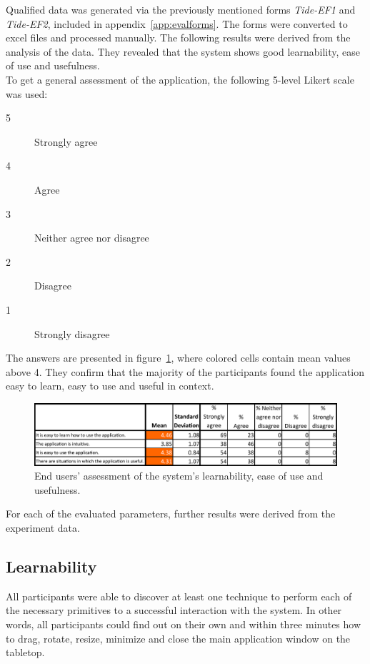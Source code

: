 Qualified data was generated via the previously mentioned forms \emph{Tide-EF1} and \emph{Tide-EF2}, included in appendix~\ref{app:evalforms}.
The forms were converted to excel files and processed manually.
The following results were derived from the analysis of the data.
They revealed that the system shows good learnability, ease of use and usefulness.
\\
\linebreak
To get a general assessment of the application, the following 5-level Likert scale was used:
\begin{tightlists}
\begin{description}
\item[5] Strongly agree
\item[4] Agree
\item[3] Neither agree nor disagree
\item[2] Disagree
\item[1] Strongly disagree
\end{description}
\end{tightlists}
The answers are presented in figure~\ref{fig:evalagree}, where colored cells contain mean values above 4.
They confirm that the majority of the participants found the application easy to learn, easy to use and useful in context.

\begin{figure}[htb]
  \centering
    \includegraphics[width=1\textwidth]{images/evalagree}
    \caption{End users' assessment of the system's learnability, ease of use and usefulness.}
    \label{fig:evalagree}
\end{figure}

For each of the evaluated parameters, further results were derived from the experiment data.

\subsection{Learnability}

All participants were able to discover at least one technique to perform each of the necessary primitives to a successful interaction with the system.
In other words, all participants could find out on their own and within three minutes how to drag, rotate, resize, minimize and close the main application window on the tabletop.

